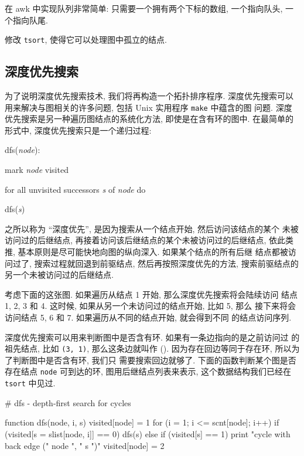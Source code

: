 在 awk 中实现队列非常简单: 只需要一个拥有两个下标的数组, 一个指向队头, 
一个指向队尾.

\begin{exercise}
    修改 \texttt{tsort}, 使得它可以处理图中孤立的结点.
\end{exercise}

\subsection{深度优先搜索}
\label{subsec:depth_first_search}

为了说明深度优先搜索技术, 我们将再构造一个拓扑排序程序. 深度优先搜索可以
用来解决与图相关的许多问题, 包括 Unix 实用程序 \texttt{make} 中蕴含的图
问题. 深度优先搜索是另一种遍历图结点的系统化方法, 即使是在含有环的图中.
在最简单的形式中, 深度优先搜索只是一个递归过程:
\begin{pattern}
    \indent dfs(\textit{node}): \par
    \indent\indent mark \textit{node} visited \par
    \indent\indent for all unvisited successors \textit{s} of \textit{node}
                do \par
    \indent\indent\indent dfs(\textit{s})
\end{pattern}
之所以称为 ``深度优先'', 是因为搜索从一个结点开始, 然后访问该结点的某个
未被访问过的后继结点, 再接着访问该后继结点的某个未被访问过的后继结点,
依此类推, 基本原则是尽可能快地向图的纵向深入. 如果某个结点的所有后继
结点都被访问过了, 搜索过程就回退到前驱结点, 然后再按照深度优先的方法,
搜索前驱结点的另一个未被访问过的后继结点.

考虑下面的这张图. 如果遍历从结点 1 开始, 那么深度优先搜索将会陆续访问
结点 1, 2, 3 和 4. 这时候, 如果从另一个未访问过的结点开始, 比如 5, 那么 
接下来将会访问结点 5, 6 和 7. 如果遍历从不同的结点开始, 就会得到不同
的结点访问序列.
\begin{center}
\end{center}

深度优先搜索可以用来判断图中是否含有环. 如果有一条边指向的是之前访问过
的祖先结点, 比如 \texttt{(3, 1)}, 那么这条边就叫作 (). 因为存在回边等同于存在环, 所以为了判断图中是否含有环, 我们只 
需要搜索回边就够了. 下面的函数判断某个图是否存在结点 \texttt{node} 
可到达的环, 图用后继结点列表来表示, 这个数据结构我们已经在 \texttt{tsort}
中见过.
\begin{awkcode}
    # dfs - depth-first search for cycles

    function dfs(node,     i, s) {
        visited[node] = 1
        for (i = 1; i <= scnt[node]; i++)
            if (visited[s = slist[node, i]] == 0)
                dfs(s)
            else if (visited[s] == 1)
                print "cycle with back edge (" node ", " s ")" 
        visited[node] = 2
    }
\end{awkcode}

